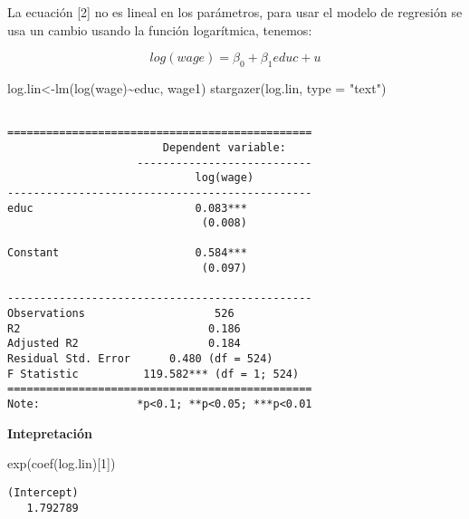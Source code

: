 \documentclass[
  letterpaper,
  DIV=11,
  numbers=noendperiod]{scrreprt}
\newenvironment{Shaded}{\begin{snugshade}}{\end{snugshade}}
\newcommand{\AttributeTok}[1]{\textcolor[rgb]{0.40,0.45,0.13}{#1}}
\newcommand{\DecValTok}[1]{\textcolor[rgb]{0.68,0.00,0.00}{#1}}
\newcommand{\FunctionTok}[1]{\textcolor[rgb]{0.28,0.35,0.67}{#1}}
\newcommand{\NormalTok}[1]{\textcolor[rgb]{0.00,0.23,0.31}{#1}}
\newcommand{\OtherTok}[1]{\textcolor[rgb]{0.00,0.23,0.31}{#1}}
\newcommand{\SpecialCharTok}[1]{\textcolor[rgb]{0.37,0.37,0.37}{#1}}
\newcommand{\StringTok}[1]{\textcolor[rgb]{0.13,0.47,0.30}{#1}}
\begin{document}
La ecuación {[}2{]} no es lineal en los parámetros, para usar el modelo
de regresión se usa un cambio usando la función logarítmica, tenemos:

\[log(wage)=\beta_0+\beta_1educ+u\]

\begin{Shaded}
\begin{Highlighting}[]
\NormalTok{log.lin}\OtherTok{\textless{}{-}}\FunctionTok{lm}\NormalTok{(}\FunctionTok{log}\NormalTok{(wage)}\SpecialCharTok{\textasciitilde{}}\NormalTok{educ,}
\NormalTok{            wage1)}
\FunctionTok{stargazer}\NormalTok{(log.lin, }
          \AttributeTok{type =} \StringTok{"text"}\NormalTok{)}
\end{Highlighting}
\end{Shaded}

\begin{verbatim}

===============================================
                        Dependent variable:    
                    ---------------------------
                             log(wage)         
-----------------------------------------------
educ                         0.083***          
                              (0.008)          
                                               
Constant                     0.584***          
                              (0.097)          
                                               
-----------------------------------------------
Observations                    526            
R2                             0.186           
Adjusted R2                    0.184           
Residual Std. Error      0.480 (df = 524)      
F Statistic          119.582*** (df = 1; 524)  
===============================================
Note:               *p<0.1; **p<0.05; ***p<0.01
\end{verbatim}

\textbf{Intepretación}

\begin{Shaded}
\begin{Highlighting}[]
\FunctionTok{exp}\NormalTok{(}\FunctionTok{coef}\NormalTok{(log.lin)[}\DecValTok{1}\NormalTok{])}
\end{Highlighting}
\end{Shaded}

\begin{verbatim}
(Intercept) 
   1.792789 
\end{verbatim}
\end{document}
